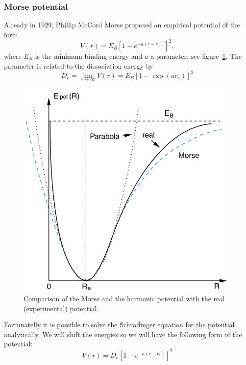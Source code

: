 \subsubsection{Morse potential}
Already in 1929, Phillip McCord Morse proposed an empirical potential
of the form \cite{Demtroeder1}
\begin{equation}
    V(r) = E_B \left[ 1 - e^{-a(r-r_e)}  \right]^2,
\end{equation}
where $E_B$ is the minimum binding energy and $a$ a parameter,
see figure~\ref{fig:Morse}. The parameter is related to the
dissociation energy by 
\begin{equation}
    D_e = \lim\limits_{r \rightarrow \infty}{V(r)}
        = E_B \left[ 1 - \exp(a r_e)  \right]^2
\end{equation}
\begin{figure}
\includegraphics[width=15cm]{pics/Morse_potential}
\caption{Comparison of the Morse and the harmonic potential
    with the real (experimental) potential\cite{Demtroeder1}.}
\label{fig:Morse}
\end{figure}
Fortunatelly it is possible to solve the Schrödinger equation
for the potential analytically. We will shift the energies 
so we will have the following form of the potential:
\begin{equation}
    V(r) = D_e \left[ 1 - e^{-a(r-r_e)}  \right]^2
\end{equation}
